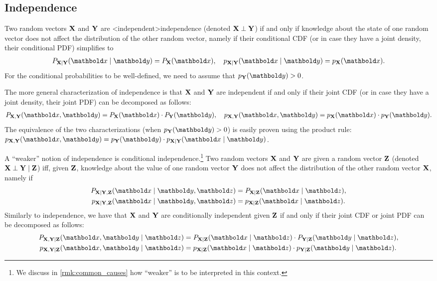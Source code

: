 \subsection{Independence}

Two random vectors $\mathbf{X}$ and $\mathbf{Y}$ are \midx<independent>{independence} (denoted $\mathbf{X} \perp \mathbf{Y}$) if and only if knowledge about the state of one random vector does not affect the distribution of the other random vector, namely if their conditional CDF (or in case they have a joint density, their conditional PDF) simplifies to \begin{align}
  P_{\rX\mid\rY}(\vx \mid \vy) = P_\rX(\vx),\quad p_{\rX\mid\rY}(\vx \mid \vy) = p_\rX(\vx).
\end{align}
For the conditional probabilities to be well-defined, we need to assume that $p_\rY(\vy) > 0$.

The more general characterization of independence is that $\mathbf{X}$ and $\mathbf{Y}$ are independent if and only if their joint CDF (or in case they have a joint density, their joint PDF) can be decomposed as follows: \begin{align}
  P_{\rX,\rY}(\vx,\vy) = P_\rX(\vx) \cdot P_\rY(\vy), \quad p_{\rX,\rY}(\vx,\vy) = p_\rX(\vx) \cdot p_\rY(\vy).
\end{align}
The equivalence of the two characterizations (when $p_\rY(\vy) > 0$) is easily proven using the product rule: $p_{\rX,\rY}(\vx,\vy) = p_\rY(\vy) \cdot p_{\rX\mid\rY}(\vx \mid \vy)$.

A ``weaker'' notion of independence is conditional independence.\footnote{We discuss in \cref{rmk:common_causes} how ``weaker'' is to be interpreted in this context.}
Two random vectors $\mathbf{X}$ and $\mathbf{Y}$ are  given a random vector $\mathbf{Z}$ (denoted $\mathbf{X} \perp \mathbf{Y} \mid \mathbf{Z}$) iff, given $\mathbf{Z}$, knowledge about the value of one random vector $\mathbf{Y}$ does not affect the distribution of the other random vector $\mathbf{X}$, namely if \begin{subequations}\begin{align}
  P_{\rX \mid \rY, \rZ}(\vx \mid \vy, \vz) &= P_{\rX \mid \rZ}(\vx \mid \vz),\\
  p_{\rX \mid \rY, \rZ}(\vx \mid \vy, \vz) &= p_{\rX \mid \rZ}(\vx \mid \vz).
\end{align}\end{subequations}
Similarly to independence, we have that $\mathbf{X}$ and $\mathbf{Y}$ are conditionally independent given $\mathbf{Z}$ if and only if their joint CDF or joint PDF can be decomposed as follows: \begin{subequations}\begin{align}
  P_{\rX,\rY \mid \rZ}(\vx,\vy \mid \vz) &= P_{\rX \mid \rZ}(\vx \mid \vz) \cdot P_{\rY \mid \rZ}(\vy \mid \vz), \\
  p_{\rX,\rY \mid \rZ}(\vx,\vy \mid \vz) &= p_{\rX \mid \rZ}(\vx \mid \vz) \cdot p_{\rY \mid \rZ}(\vy \mid \vz).
\end{align}\end{subequations}

